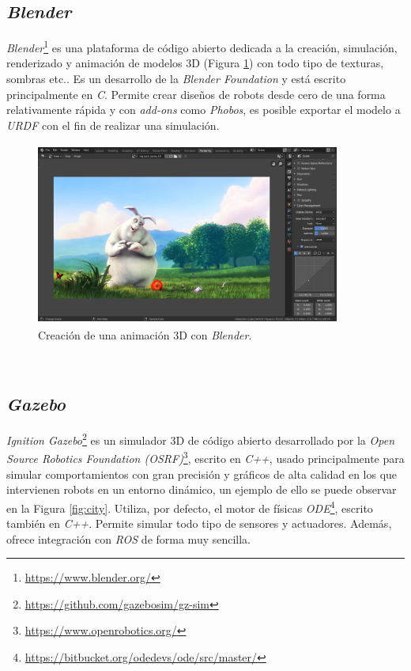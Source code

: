 \subsection{\textit{Blender}}
\label{subsection:blender}
\textit{Blender}\footnote{\url{https://www.blender.org/}} es una plataforma de código abierto dedicada a la creación, simulación, renderizado y animación de modelos 3D (Figura \ref{fig:blender}) con todo tipo de texturas, sombras etc.. Es un desarrollo de la \textit{Blender Foundation} y está escrito principalmente en \textit{C}. Permite crear diseños de robots desde cero de una forma relativamente rápida y con \textit{add-ons} como \textit{Phobos}, es posible exportar el modelo a \textit{URDF} con el fin de realizar una simulación\cite{phobos}.\\

\begin{figure} [h!]
	\begin{center}
		\includegraphics[width=10cm, height=6cm]{figs/blender}
	\end{center}
	\caption{Creación de una animación 3D con \textit{Blender}.}
	\label{fig:blender}
\end{figure}\

\subsection{\textit{Gazebo}}
\label{subsection:gazebo}
\textit{Ignition Gazebo}\footnote{\url{https://github.com/gazebosim/gz-sim}} es un simulador 3D de código abierto desarrollado por la \textit{Open Source Robotics Foundation (OSRF)}\footnote{\url{https://www.openrobotics.org/}}, escrito en \textit{C++}, usado principalmente para simular comportamientos con gran precisión y gráficos de alta calidad en los que intervienen robots en un entorno dinámico, un ejemplo de ello se puede observar en la Figura \ref{fig:city}. Utiliza, por defecto, el motor de físicas \textit{ODE}\footnote{\url{https://bitbucket.org/odedevs/ode/src/master/}}, escrito también en \textit{C++}. Permite simular todo tipo de sensores y actuadores. Además, ofrece integración con \textit{ROS} de forma muy sencilla.\\

